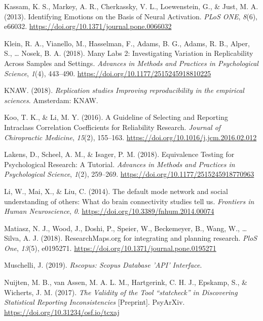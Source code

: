 \documentclass[
  man,floatsintext]{apa6}
\newlength{\cslhangindent}
\newlength{\cslentryspacingunit} %
\newenvironment{CSLReferences}[2] %
 {%
  \setlength{\parindent}{0pt}
  \ifodd #1
  \let\oldpar\par
  \def\par{\hangindent=\cslhangindent\oldpar}
  \fi
  \setlength{\parskip}{#2\cslentryspacingunit}
 }%
 {}
\begin{document}
\begin{CSLReferences}{1}{0}
\leavevmode{}%
Kassam, K. S., Markey, A. R., Cherkassky, V. L., Loewenstein, G., \& Just, M. A. (2013). Identifying {Emotions} on the {Basis} of {Neural Activation}. \emph{PLoS ONE}, \emph{8}(6), e66032. \url{https://doi.org/10.1371/journal.pone.0066032}

\leavevmode{}%
Klein, R. A., Vianello, M., Hasselman, F., Adams, B. G., Adams, R. B., Alper, S., \ldots{} Nosek, B. A. (2018). Many {Labs} 2: {Investigating Variation} in {Replicability Across Samples} and {Settings}. \emph{Advances in Methods and Practices in Psychological Science}, \emph{1}(4), 443--490. \url{https://doi.org/10.1177/2515245918810225}

\leavevmode{}%
KNAW. (2018). \emph{Replication studies \textendash{} {Improving} reproducibility in the empirical sciences}. {Amsterdam}: {KNAW}.

\leavevmode{}%
Koo, T. K., \& Li, M. Y. (2016). A {Guideline} of {Selecting} and {Reporting Intraclass Correlation Coefficients} for {Reliability Research}. \emph{Journal of Chiropractic Medicine}, \emph{15}(2), 155--163. \url{https://doi.org/10.1016/j.jcm.2016.02.012}

\leavevmode{}%
Lakens, D., Scheel, A. M., \& Isager, P. M. (2018). Equivalence {Testing} for {Psychological Research}: {A Tutorial}. \emph{Advances in Methods and Practices in Psychological Science}, \emph{1}(2), 259--269. \url{https://doi.org/10.1177/2515245918770963}

\leavevmode{}%
Li, W., Mai, X., \& Liu, C. (2014). The default mode network and social understanding of others: What do brain connectivity studies tell us. \emph{Frontiers in Human Neuroscience}, \emph{0}. \url{https://doi.org/10.3389/fnhum.2014.00074}

\leavevmode{}%
Matiasz, N. J., Wood, J., Doshi, P., Speier, W., Beckemeyer, B., Wang, W., \ldots{} Silva, A. J. (2018). {ResearchMaps}.org for integrating and planning research. \emph{PloS One}, \emph{13}(5), e0195271. \url{https://doi.org/10.1371/journal.pone.0195271}

\leavevmode{}%
Muschelli, J. (2019). \emph{Rscopus: {Scopus Database} '{API}' {Interface}}.

\leavevmode{}%
Nuijten, M. B., van Assen, M. A. L. M., Hartgerink, C. H. J., Epskamp, S., \& Wicherts, J. M. (2017). \emph{The {Validity} of the {Tool} {``statcheck''} in {Discovering Statistical Reporting Inconsistencies}} {[}Preprint{]}. {PsyArXiv}. \url{https://doi.org/10.31234/osf.io/tcxaj}


\end{CSLReferences}
\end{document}
